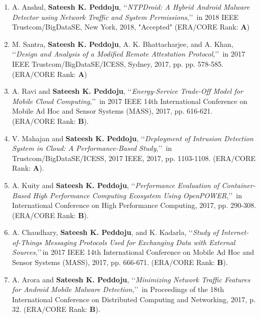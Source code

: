 \begin{enumerate}%

	\item
	A. Anshul, \textbf{Sateesh K. Peddoju}, \lq\lq \textit{NTPDroid: A Hybrid Android Malware Detector using Network Traffic and System Permissions},\rq\rq\, in 2018 IEEE Trustcom/BigDataSE, New York, 2018, "Accepted" (ERA/CORE Rank: \textbf{A})
	
	\item
	M. Santra, \textbf{Sateesh K. Peddoju}, A. K. Bhattacharjee, and A. Khan, \lq\lq \textit{Design and Analysis of a Modified Remote Attestation Protocol},\rq\rq\, in 2017 IEEE Trustcom/BigDataSE/ICESS, Sydney, 2017, pp. pp. 578-585. (ERA/CORE Rank: \textbf{A})
	
	\item
	A. Ravi and \textbf{Sateesh K. Peddoju}, \lq\lq \textit{Energy-Service Trade-Off Model for Mobile Cloud Computing},\rq\rq\, in 2017 IEEE 14th International Conference on Mobile Ad Hoc and Sensor Systems (MASS), 2017, pp. 616-621. (ERA/CORE Rank: \textbf{B}).
	
	\item
	V. Mahajan and \textbf{Sateesh K. Peddoju}, \lq\lq \textit{Deployment of Intrusion Detection System in Cloud: A Performance-Based Study},\rq\rq\,  in Trustcom/BigDataSE/ICESS, 2017 IEEE, 2017, pp. 1103-1108. (ERA/CORE Rank: \textbf{A}).
	
	\item
	A. Kuity and \textbf{Sateesh K. Peddoju}, \lq\lq \textit{Performance Evaluation of Container-Based High Performance Computing Ecosystem Using OpenPOWER},\rq\rq\,  in International Conference on High Performance Computing, 2017, pp. 290-308. (ERA/CORE Rank: \textbf{B}).
	
	\item
	A. Chaudhary, \textbf{Sateesh K. Peddoju}, and K. Kadarla, \lq\lq \textit{Study of Internet-of-Things Messaging Protocols Used for Exchanging Data with External Sources},\rq\rq\,in 2017 IEEE 14th International Conference on Mobile Ad Hoc and Sensor Systems (MASS), 2017, pp. 666-671. (ERA/CORE Rank: \textbf{B}).
	
	\item
	A. Arora and \textbf{Sateesh K. Peddoju}, \lq\lq \textit{Minimizing Network Traffic Features for Android Mobile Malware Detection},\rq\rq\, in Proceedings of the 18th International Conference on Distributed Computing and Networking, 2017, p. 32. (ERA/CORE Rank: \textbf{B}).
	

\end{enumerate}
